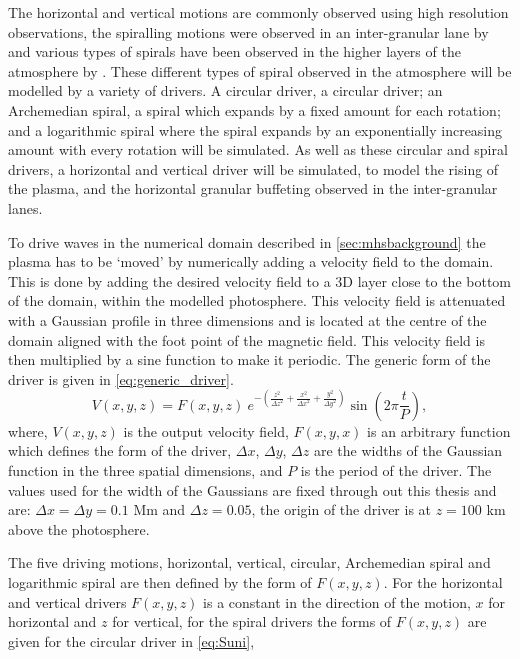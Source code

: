 The horizontal and vertical motions are commonly observed using high resolution observations, the spiralling motions were observed in an inter-granular lane by \cite{Bonet2008, Bonet2010} and various types of spirals have been observed in the higher layers of the atmosphere by \cite{Wedemeyer-Bohm2009,Wedemeyer-Bohm2012,Wedemeyer2013}.
These different types of spiral observed in the atmosphere will be modelled by a variety of drivers.
A circular driver, a circular driver; an Archemedian spiral, a spiral which expands by a fixed amount for each rotation; and a logarithmic spiral where the spiral expands by an exponentially increasing amount with every rotation will be simulated.
As well as these circular and spiral drivers, a horizontal and vertical driver will be simulated, to model the rising of the plasma, and the horizontal granular buffeting observed in the inter-granular lanes.

To drive waves in the numerical domain described in \cref{sec:mhsbackground} the plasma has to be `moved' by numerically adding a velocity field to the domain.
This is done by adding the desired velocity field to a 3D layer close to the bottom of the domain, within the modelled photosphere.
This velocity field is attenuated with a Gaussian profile in three dimensions and is located at the centre of the domain aligned with the foot point of the magnetic field.
This velocity field is then multiplied by a sine function to make it periodic. The generic form of the driver is given in \cref{eq:generic_driver}.
\begin{equation}
	V(x,y,z) = F(x,y,z) \ e^{-\left(\frac{z^2}{\Delta z^2} + \frac{x^2}{\Delta x^2} + \frac{y^2}{\Delta y^2}\right)} \sin \left(2\pi \frac{t}{P}\right),
	\label{eq:generic_driver}
\end{equation}
where, $V(x,y,z)$ is the output velocity field, $F(x,y,x)$ is an arbitrary function which defines the form of the driver, $\Delta x$, $\Delta y$, $\Delta z$ are the widths of the Gaussian function in the three spatial dimensions, and $P$ is the period of the driver.
The values used for the width of the Gaussians are fixed through out this thesis and are: $\Delta x = \Delta y = 0.1$ Mm and $\Delta z = 0.05$, the origin of the driver is at $z = 100$ km above the photosphere.

The five driving motions, horizontal, vertical, circular, Archemedian spiral and logarithmic spiral are then defined by the form of $F(x,y,z)$. For the horizontal and vertical drivers $F(x,y,z)$ is a constant in the direction of the motion, $x$ for horizontal and $z$ for vertical, for the spiral drivers the forms of $F(x,y,z)$ are given for the circular driver in \cref{eq:Suni},

